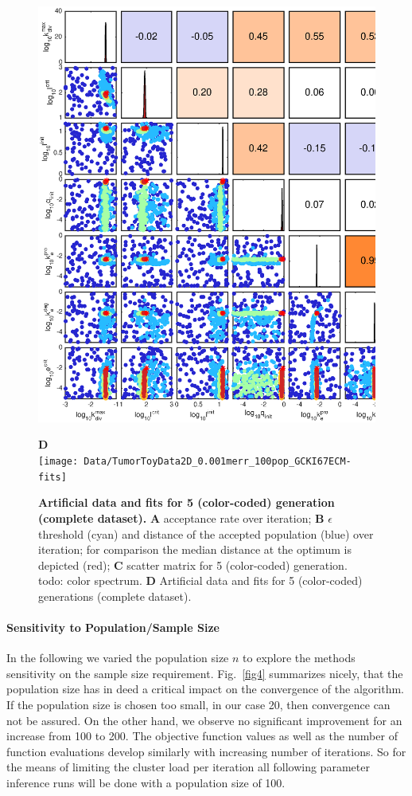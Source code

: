 \documentclass[10pt,letterpaper]{article}
\begin{document}
\begin{figure}[htbp]
\begin{minipage}[t]{0.66\textwidth}
\includegraphics[width=\textwidth]{Data/TumorToyData2D_0.001merr_100pop_GCKI67ECM-scatterPlotMatrix}
\end{minipage}
\textbf{D}\\
\texttt{[image: Data/TumorToyData2D\_0.001merr\_100pop\_GCKI67ECM-fits]}
\caption{{\bf Artificial data and fits for 5 (color-coded) generation (complete dataset).}
\textbf{A}  acceptance rate over iteration; \textbf{B} $\epsilon$ threshold (cyan) and distance of the accepted population (blue) over iteration; for comparison the median distance at the optimum is depicted (red); \textbf{C} scatter matrix for 5 (color-coded) generation. todo: color spectrum. \textbf{D} Artificial data and fits for 5 (color-coded) generations (complete dataset).}
\label{fig3}
\end{figure}


\paragraph{Sensitivity to Population/Sample Size}
In the following we varied the population size $n$ to explore the methods sensitivity on the sample size requirement. Fig.~\ref{fig4} summarizes nicely, that the population size has in deed a critical impact on the convergence of the algorithm. If the population size is chosen too small, in our case 20, then convergence can not be assured. On the other hand, we observe no significant improvement for an increase from 100 to 200. The objective function values as well as the number of function evaluations develop similarly with increasing number of iterations. So for the means of limiting the cluster load per iteration all following parameter inference runs will be done with a population size of 100.
\end{document}
